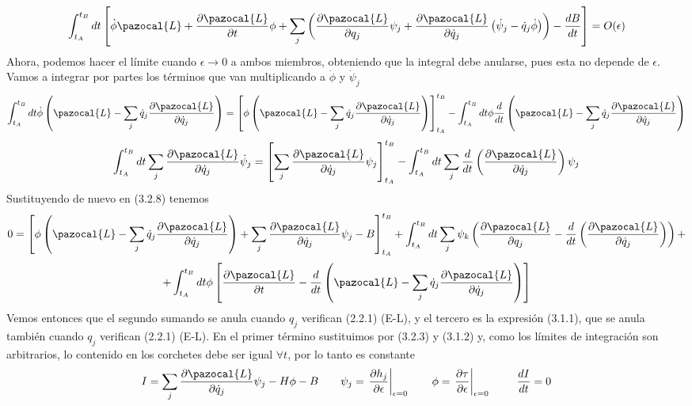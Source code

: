 \begin{equation} \label{3.3.2}
    \int_{t_A}^{t_B} dt\left[\dot{\phi}\pazocal{L} +\frac{\partial \pazocal{L}}{\partial t}\phi +\sum_j \left(\frac{\partial \pazocal{L}}{\partial q_j} \psi_j + \frac{\partial \pazocal{L}}{\partial \dot{q}_j} \left(\dot{\psi}_j-\dot{q}_j \dot{\phi}\right)\right)- \frac{dB}{dt}\right] = O(\epsilon)
\end{equation} 
Ahora, podemos hacer el límite cuando $\epsilon \rightarrow 0$ a ambos miembros, obteniendo que la integral debe anularse, pues esta no depende de $\epsilon$. Vamos a integrar por partes los términos que van multiplicando a $\dot{\phi}$ y $\dot{\psi}_j$
\begin{equation} \label{3.3.2}
    \int_{t_A}^{t_B} dt \dot{\phi}\left(\pazocal{L}-\sum_j \dot{q}_j\frac{\partial \pazocal{L}}{\partial \dot{q}_j}\right) = \left[\phi \left(\pazocal{L}-\sum_j \dot{q}_j\frac{\partial \pazocal{L}}{\partial \dot{q}_j}\right) \right]_{t_A}^{t_B} - \int_{t_A}^{t_B} dt \phi \frac{d}{dt}\left(\pazocal{L}-\sum_j \dot{q}_j\frac{\partial \pazocal{L}}{\partial \dot{q}_j}\right)
\end{equation} 
\begin{equation} \label{3.3.2}
    \int_{t_A}^{t_B} dt \sum_j \frac{\partial \pazocal{L}}{\partial \dot{q}_j} \dot{\psi}_j = \left[\sum_j \frac{\partial \pazocal{L}}{\partial \dot{q}_j} \psi_j\right]_{t_A}^{t_B} - \int_{t_A}^{t_B} dt \sum_j \frac{d}{dt}\left(\frac{\partial \pazocal{L}}{\partial \dot{q}_j}\right) \psi_j
\end{equation} 
Sustituyendo de nuevo en (3.2.8) tenemos
\[
    0 =  \left[ \phi \left(\pazocal{L}-\sum_j \dot{q}_j\frac{\partial \pazocal{L}}{\partial \dot{q}_j}\right) +\sum_j \frac{\partial \pazocal{L}}{\partial \dot{q}_j} \psi_j - B\right]_{t_A}^{t_B} +  \int_{t_A}^{t_B} dt \sum_j \psi_k \left(\frac{\partial \pazocal{L}}{\partial q_j}-\frac{d}{dt}\left(\frac{\partial \pazocal{L}}{\partial \dot{q}_j}\right)\right) + 
\]\begin{equation} \label{3.3.2}
    +\int_{t_A}^{t_B} dt \phi\left[\frac{\partial \pazocal{L}}{\partial t} -\frac{d}{dt}\left(\pazocal{L}-\sum_j \dot{q}_j\frac{\partial \pazocal{L}}{\partial \dot{q}_j}\right)\right]
\end{equation} 
Vemos entonces que el segundo sumando se anula cuando $q_j$ verifican (2.2.1) (E-L), y el tercero es la expresión (3.1.1), que se anula también cuando $q_j$ verifican (2.2.1) (E-L). En el primer término sustituimos por (3.2.3) y (3.1.2) y, como los límites de integración son arbitrarios, lo contenido en los corchetes debe ser igual $\forall t$, por lo tanto es constante
\begin{equation} \label{3.3.2}
    I = \sum_j \frac{\partial \pazocal{L}}{\partial \dot{q}_j} \psi_j - H\phi -B \ \ \ \ \ \ \psi_j = \left.\frac{\partial h_j}{\partial \epsilon}\right|_{\epsilon=0} \ \ \ \ \ \ \phi = \left.\frac{\partial \tau}{\partial \epsilon}\right|_{\epsilon=0}  \ \ \ \ \ \ \ \frac{dI}{dt} = 0 
\end{equation} 
